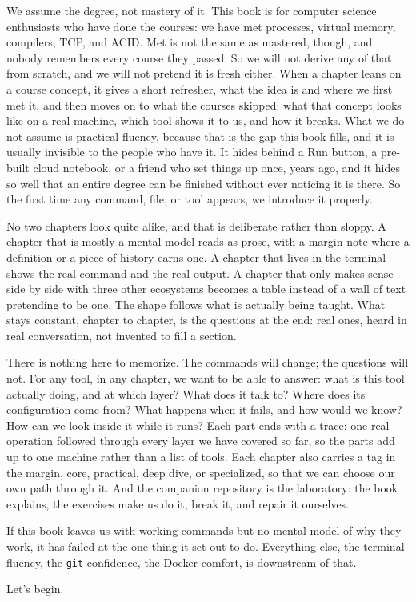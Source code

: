 We assume the degree, not mastery of it. This book is for computer science enthusiasts who
have done the courses: we have met processes, virtual memory, compilers, TCP, and ACID. Met
is not the same as mastered, though, and nobody remembers every course they passed. So we
will not derive any of that from scratch, and we will not pretend it is fresh either. When a
chapter leans on a course concept, it gives a short refresher, what the idea is and where we
first met it, and then moves on to what the courses skipped: what that concept looks like on
a real machine, which tool shows it to us, and how it breaks. What we do not assume is practical fluency, because that is the gap this book
fills, and it is usually invisible to the people who have it. It hides behind a Run button,
a pre-built cloud notebook, or a friend who set things up once, years ago, and it hides so
well that an entire degree can be finished without ever noticing it is there. So the first
time any command, file, or tool appears, we introduce it properly.

No two chapters look quite alike, and that is deliberate rather than sloppy. A chapter
that is mostly a mental model reads as prose, with a margin note where a definition or a
piece of history earns one. A chapter that lives in the terminal shows the real command
and the real output. A chapter that only makes sense side by side with three other
ecosystems becomes a table instead of a wall of text pretending to be one. The shape
follows what is actually being taught. What stays constant, chapter to chapter, is the
questions at the end: real ones, heard in real conversation, not invented to fill a
section.


There is nothing here to memorize. The commands will change; the questions will not. For
any tool, in any chapter, we want to be able to answer: what is this tool actually doing,
and at which layer? What does it talk to? Where does its configuration come from? What
happens when it fails, and how would we know? How can we look inside it while it runs? Each
part ends with a trace: one real operation followed through every layer we have covered so
far, so the parts add up to one machine rather than a list of tools. Each chapter also
carries a tag in the margin, core, practical, deep dive, or specialized, so that we can
choose our own path through it. And the companion repository is the laboratory: the book
explains, the exercises make us do it, break it, and repair it ourselves.

If this book leaves us with working commands but no mental model of why they work, it has
failed at the one thing it set out to do. Everything else, the terminal fluency, the
\texttt{git} confidence, the Docker comfort, is downstream of that.

Let's begin.
